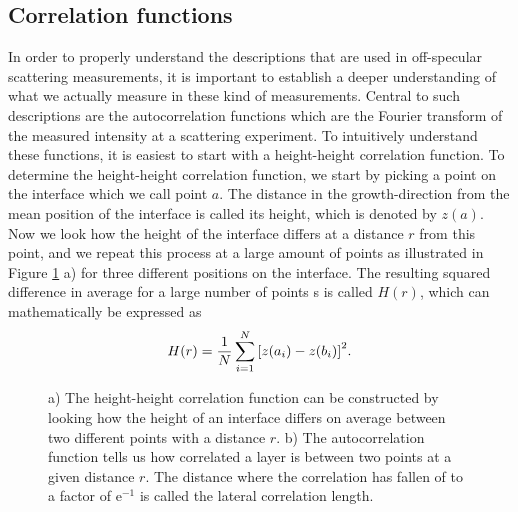 \subsection{Correlation functions}
In order to properly understand the descriptions that are used in off-specular scattering measurements, it is important to establish a deeper understanding of what we actually measure in these kind of measurements. Central to such descriptions are the autocorrelation functions which are the Fourier transform of the measured intensity at a scattering experiment. To intuitively understand these functions, it is easiest to start with a height-height correlation function. To determine the height-height correlation function, we start by picking a point on the interface which we call point $a$. The distance in the growth-direction from the mean position of the interface is called its height, which is denoted by $z(a)$. Now we look how the height of the interface differs at a distance $r$ from this point, and we repeat this process at a large amount of points as illustrated in Figure \ref{correlation_function} a) for three different positions on the interface. The resulting squared difference in average for a large number of points s is called $H(r)$, which can mathematically be expressed as
\begin{equation}
	H(r) = \frac{1}{N}\sum_{i=1}^{N} \qty[z(a_i) - z(b_i)]^2.
\end{equation}
\begin{figure}[hb]
	\centering
	\def\svgwidth{\textwidth}
	
	\caption{a) The height-height correlation function can be constructed by looking how the height of an interface differs on average between two different points with a distance $r$. b) The autocorrelation function tells us how correlated a layer is between two points at a given distance $r$. The distance where the correlation has fallen of to a factor of e$^{-1}$ is called the lateral correlation length.}
	\label{correlation_function}
\end{figure}
